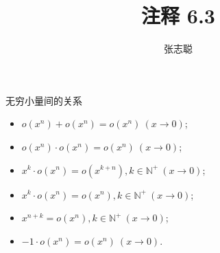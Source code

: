 \documentclass{article}
\begin{document}
\title{注释 6.3}
\author{张志聪}
\maketitle




\begin{zremark}
  无穷小量间的关系
\end{zremark}

\begin{itemize}
  \item $o(x^n) + o(x^n) = o(x^n) \ (x \to 0)$;
  \item $o(x^n) \cdot o(x^n) = o(x^n) \ (x \to 0)$;
  \item $x^k \cdot o(x^n) = o(x^{k + n}), k \in \mathbb{N^+} \ (x \to 0)$;
  \item $x^k \cdot o(x^n) = o(x^{n}), k \in \mathbb{N^+} \ (x \to 0)$;
  \item $x^{n + k} = o(x^n), k \in \mathbb{N^+} \ (x \to 0)$;
  \item $-1 \cdot o(x^n) = o(x^n) \ (x \to 0)$.
\end{itemize}
\end{document}
